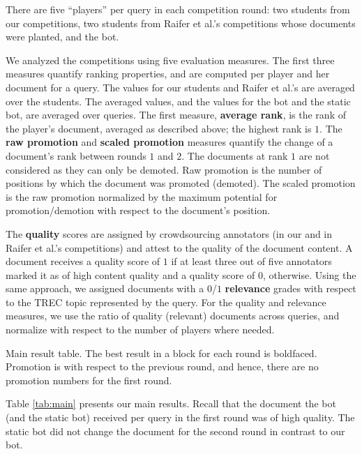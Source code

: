 There are
five ``players'' per query in each competition round: two students from our competitions, two students
from Raifer et al.'s competitions whose documents were planted, and
the bot.

We analyzed the competitions using five evaluation measures.
The first three measures quantify ranking properties, and are computed
per player and her document for a query. The values for our students
and Raifer et al.'s are averaged over
the students. The averaged values, and the values for the bot and the static bot, are averaged over
queries. The first measure, {\bf average rank}, is 
the rank of the player's document, averaged as described
above; the highest rank is $1$. The {\bf raw promotion} and {\bf
  scaled promotion} measures quantify the change of a document's rank between rounds $1$ and $2$. The documents at rank $1$ are not considered as they can only be demoted. Raw promotion is the number of
positions by which the document was promoted (demoted).
The scaled promotion is the raw
promotion normalized by the maximum potential for promotion/demotion with respect to the
document's position.



The {\bf quality} scores are assigned by crowdsourcing
annotators (in our and in Raifer et al.'s competitions) and
attest to the quality of the document content. A document receives a
quality score of $1$ if at least three out of five annotators marked
it as of high content quality and a quality score of $0$,
otherwise. Using the same approach, we assigned documents with a
$0$/$1$ {\bf relevance} grades with respect to the TREC topic
represented by the query. For the quality and relevance measures, we use the ratio of quality (relevant) documents across queries,
and normalize with respect to the number of players where needed.

\begin{table}[t]
  \caption{\label{tab:main} Main result table. The best result in a block for each round is boldfaced. Promotion is with respect to the previous round, and hence, there are no promotion numbers for the first round. }
    \small
  \center
  
% 
  \end{table}
Table \ref{tab:main} presents our main results. Recall that the document
the bot (and the static bot) received per query in the first round was of high quality. The static bot did not change the document for the second round in contrast to our bot.

